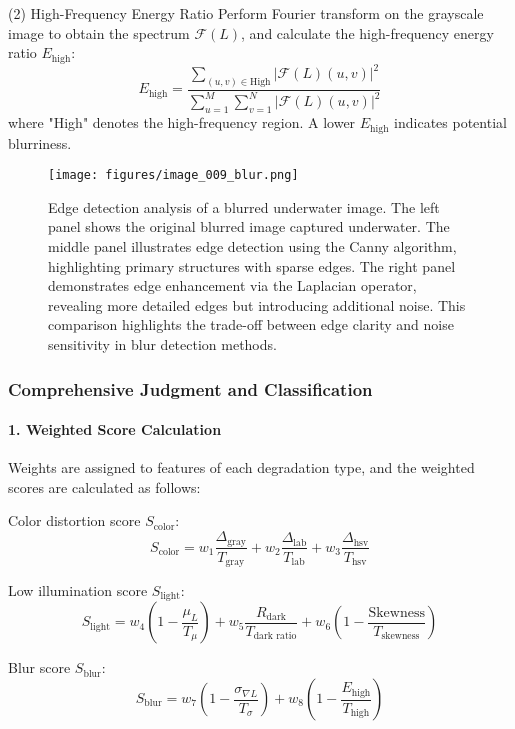 \documentclass{apmcmthesis}
\begin{document}
(2) High-Frequency Energy Ratio  
Perform Fourier transform on the grayscale image to obtain the spectrum $\mathcal{F}(L)$, and calculate the high-frequency energy ratio $E_{\text{high}}$:  
\[
E_{\text{high}} = \frac{ \sum\limits_{ (u, v) \in \text{High} } |\mathcal{F}(L)(u, v)|^2 }{ \sum\limits_{u=1}^{M} \sum\limits_{v=1}^{N} |\mathcal{F}(L)(u, v)|^2 }
\]
where "High" denotes the high-frequency region. A lower $E_{\text{high}}$ indicates potential blurriness.

\begin{figure}[!ht]
    \centering
    \texttt{[image: figures/image\_009\_blur.png]}
    \caption{Edge detection analysis of a blurred underwater image. The left panel shows the original blurred image captured underwater. The middle panel illustrates edge detection using the Canny algorithm, highlighting primary structures with sparse edges. The right panel demonstrates edge enhancement via the Laplacian operator, revealing more detailed edges but introducing additional noise. This comparison highlights the trade-off between edge clarity and noise sensitivity in blur detection methods.}
    \label{fig:example_3}
\end{figure}

\subsubsection{Comprehensive Judgment and Classification}
\paragraph{1. Weighted Score Calculation}  
Weights are assigned to features of each degradation type, and the weighted scores are calculated as follows:

Color distortion score $S_{\text{color}}$:
\[
S_{\text{color}} = w_1 \frac{\Delta_{\text{gray}}}{T_{\text{gray}}} + w_2 \frac{\Delta_{\text{lab}}}{T_{\text{lab}}} + w_3 \frac{\Delta_{\text{hsv}}}{T_{\text{hsv}}}
\]

Low illumination score $S_{\text{light}}$:
\[
S_{\text{light}} = w_4 \left( 1 - \frac{\mu_L}{T_{\mu}} \right) + w_5 \frac{R_{\text{dark}}}{T_{\text{dark ratio}}} + w_6 \left( 1 - \frac{\text{Skewness}}{T_{\text{skewness}}} \right)
\]

Blur score $S_{\text{blur}}$:
\[
S_{\text{blur}} = w_7 \left( 1 - \frac{\sigma_{\nabla L}}{T_{\sigma}} \right) + w_8 \left( 1 - \frac{E_{\text{high}}}{T_{\text{high}}} \right)
\]
\end{document}
